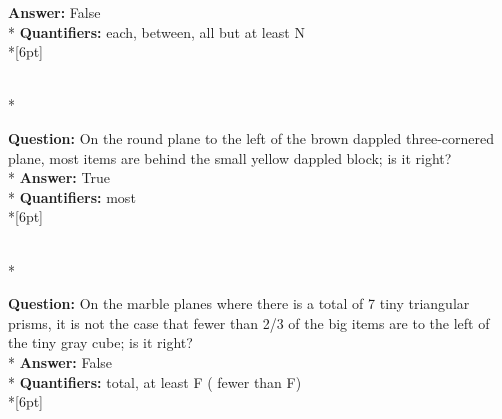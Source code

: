 \begin{figure*}
\begin{minipage}{0.48\textwidth}
\begin{minipage}[t][2.2cm][t]{1\textwidth}
      \textbf{Answer:} False \\*
      \textbf{Quantifiers:} each, between, all but at least N \\*[6pt]
    \end{minipage}\\*
    \begin{minipage}[t][2.2cm][t]{1\textwidth}
      \footnotesize
      \textbf{Question:} On the round plane to the left of the brown dappled three-cornered plane, most items are behind the small yellow dappled block; is it right? \\*
      \textbf{Answer:} True \\*
      \textbf{Quantifiers:} most \\*[6pt]
    \end{minipage}\\*
    \begin{minipage}[t][2.2cm][t]{1\textwidth}
      \footnotesize
      \textbf{Question:} On the marble planes where there is a total of 7 tiny triangular prisms, it is not the case that fewer than 2/3 of the big items are to the left of the tiny gray cube; is it right? \\*
      \textbf{Answer:} False \\*
      \textbf{Quantifiers:} total, at least F ( fewer than F) \\*[6pt]
    \end{minipage}
  \end{minipage}
\end{figure*}




